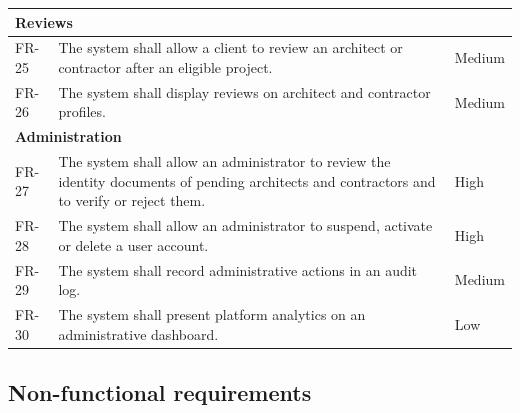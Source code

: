 {\begin{longtable}{|l|p{9.2cm}|l|}
  \multicolumn{3}{|l|}{\textbf{Reviews}} \\
  \hline
  FR-25 & The system shall allow a client to review an architect or
          contractor after an eligible project. & Medium \\
  \hline
  FR-26 & The system shall display reviews on architect and contractor
          profiles. & Medium \\
  \hline

  \multicolumn{3}{|l|}{\textbf{Administration}} \\
  \hline
  FR-27 & The system shall allow an administrator to review the identity
          documents of pending architects and contractors and to verify
          or reject them. & High \\
  \hline
  FR-28 & The system shall allow an administrator to suspend, activate
          or delete a user account. & High \\
  \hline
  FR-29 & The system shall record administrative actions in an audit
          log. & Medium \\
  \hline
  FR-30 & The system shall present platform analytics on an
          administrative dashboard. & Low \\
  \hline
\end{longtable}
}

\subsection{Non-functional requirements}
\label{subsec:nonfunctional-requirements}

